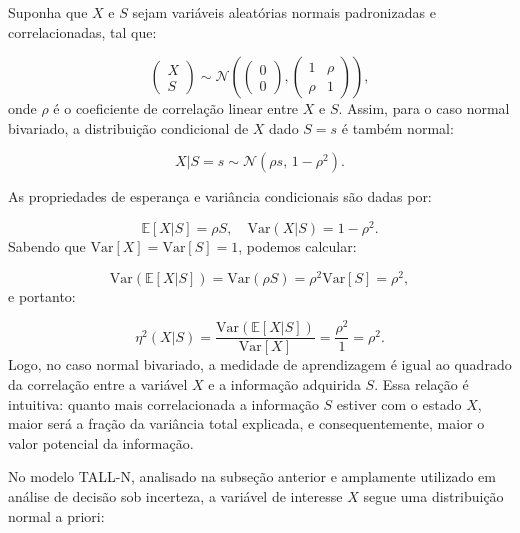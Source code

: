Suponha que $X$ e $S$ sejam variáveis aleatórias normais padronizadas e correlacionadas, tal que:

\begin{equation}
\begin{pmatrix} X \\ S \end{pmatrix}
\sim
\mathcal{N}\!\left(
\begin{pmatrix} 0 \\ 0 \end{pmatrix},
\begin{pmatrix}
1 & \rho \\
\rho & 1
\end{pmatrix}
\right),
\label{eq:bivariate-normal}
\end{equation}
onde $\rho$ é o coeficiente de correlação linear entre $X$ e $S$.  Assim, para o caso normal bivariado, a distribuição condicional de $X$ dado $S=s$ é também normal:

\begin{equation}
X|S=s \sim \mathcal{N}(\rho s,\, 1 - \rho^2).
\label{eq:conditional}
\end{equation}

As propriedades de esperança e variância condicionais são dadas por:

\begin{equation}
\mathbb{E}[X|S] = \rho S, 
\quad
\mathrm{Var}(X|S) = 1 - \rho^2.
\label{eq:cond-mean-var}
\end{equation}
Sabendo que $\mathrm{Var}[X] = \mathrm{Var}[S] = 1$, podemos calcular:

\begin{equation}
\mathrm{Var}(\mathbb{E}[X|S]) = \mathrm{Var}(\rho S) = \rho^2\mathrm{Var}[S]=\rho^2,
\label{eq:explained-var}
\end{equation}
e portanto:

\begin{equation}
\eta^2(X|S) = 
\frac{\mathrm{Var}(\mathbb{E}[X|S])}{\mathrm{Var}[X]} 
= 
\frac{\rho^2}{1}
= 
\rho^2.
\label{eq:eta2-rho2}
\end{equation}
Logo, no caso normal bivariado, a medidade de aprendizagem é igual ao quadrado da correlação entre a variável $X$ e a informação adquirida $S$.  Essa relação é intuitiva: quanto mais correlacionada a informação $S$ estiver com o estado $X$, maior será a fração da variância total explicada, e consequentemente, maior o valor potencial da informação.

No modelo TALL-N, analisado na subseção anterior e amplamente utilizado em análise de decisão sob incerteza, a variável de interesse $X$ segue uma distribuição normal a priori:


